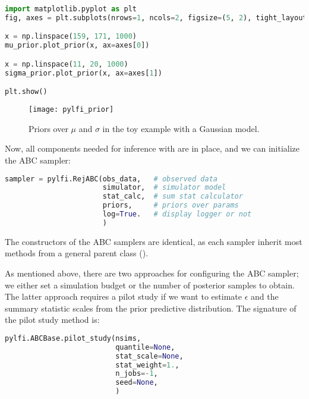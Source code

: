 \begin{lstlisting}[language=python]
import matplotlib.pyplot as plt
fig, axes = plt.subplots(nrows=1, ncols=2, figsize=(5, 2), tight_layout=True)

x = np.linspace(159, 171, 1000)
mu_prior.plot_prior(x, ax=axes[0])

x = np.linspace(11, 20, 1000)
sigma_prior.plot_prior(x, ax=axes[1])

plt.show()
\end{lstlisting}

\begin{figure}[H]
\begin{center}\texttt{[image: pylfi\_prior]}
\end{center}
\caption{Priors over $\mu$ and $\sigma$ in the toy example with a Gaussian model.}
\end{figure}

Now, all components needed for inference with  are in place, and we can initialize the ABC sampler: 

\begin{lstlisting}[language=python]
sampler = pylfi.RejABC(obs_data,   # observed data
                       simulator,  # simulator model
                       stat_calc,  # sum stat calculator
                       priors,     # priors over params
                       log=True.   # display logger or not
                       )
\end{lstlisting}

The constructors of the ABC samplers are identical, as each sampler inherit most methods from a general parent class (). 

As mentioned above, there are two approaches for configuring the ABC sampler; we either set a simulation budget or the number of posterior samples to obtain. The latter approach requires a pilot study if we want to estimate $\epsilon$ and the summary statistic scales from the prior predictive distribution. The signature of the pilot study method is: 

\begin{lstlisting}[language=python]
pylfi.ABCBase.pilot_study(nsims,
                          quantile=None, 
                          stat_scale=None,
                          stat_weight=1.,
                          n_jobs=-1,
                          seed=None,
                          )
\end{lstlisting}

